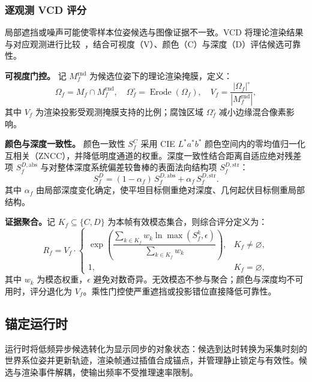 \documentclass[review]{vgtc}
\begin{document}
\subsubsection{逐观测 VCD 评分}

局部遮挡或噪声可能使零样本位姿候选与图像证据不一致。VCD 将理论渲染结果与对应观测进行比较~\cite{deepim2018,latentfusion2020,focalpose2022}，结合可视度（V）、颜色（C）与深度（D）评估候选可靠性。

\textbf{可视度门控。}
记 $M_f^{\mathrm{rnd}}$ 为候选位姿下的理论渲染掩膜，定义：
\begin{equation}
\Omega_f = M_f \cap M_f^{\mathrm{rnd}}, \quad \Omega_f^{\circ} = \operatorname{Erode}(\Omega_f), \quad V_f = \frac{|\Omega_f|^{\circ}}{|M_f^{\mathrm{rnd}}|},
\label{eq:visibility}
\end{equation}
其中 $V_f$ 为渲染投影受观测掩膜支持的比例；腐蚀区域 $\Omega_f^\circ$ 减小边缘混合像素影响。

\textbf{颜色与深度一致性。}
颜色一致性 $S_f^C$ 采用 CIE $L^*a^*b^*$ 颜色空间内的零均值归一化互相关（ZNCC），并降低明度通道的权重。深度一致性结合距离自适应绝对残差项 $S_f^{D,\mathrm{abs}}$ 与对整体深度系统偏差较鲁棒的表面法向结构项 $S_f^{D,\mathrm{str}}$：
\begin{equation}
S_f^D = (1-\alpha_f)\,S_f^{D,\mathrm{abs}} + \alpha_f\,S_f^{D,\mathrm{str}}.
\label{eq:depth-score}
\end{equation}
其中 $\alpha_f$ 由局部深度变化确定，使平坦目标侧重绝对深度、几何起伏目标侧重局部结构。

\textbf{证据聚合。}记 $K_f\subseteq\{C,D\}$ 为本帧有效模态集合，则综合评分定义为：
\begin{equation}
R_f = V_f \cdot
\begin{cases}
\exp\!\left(\dfrac{\sum_{k \in K_f} w_k \ln \max(S_f^{k}, \epsilon)}{\sum_{k \in K_f} w_k}\right), & K_f \neq \varnothing, \\[6pt]
1, & K_f = \varnothing,
\end{cases}
\label{eq:vcd}
\end{equation}
其中 $w_k$ 为模态权重，$\epsilon$ 避免对数奇异。无效模态不参与聚合；颜色与深度均不可用时，评分退化为 $V_f$。乘性门控使严重遮挡或投影错位直接降低可靠性。

\subsection{锚定运行时}\label{sec:anchoring}

运行时将低频异步候选转化为显示同步的对象状态：候选到达时转换为采集时刻的世界系位姿并更新轨迹，渲染帧通过插值合成锚点，并管理静止锁定与有效性。候选与渲染事件解耦，使输出频率不受推理速率限制。
\end{document}
